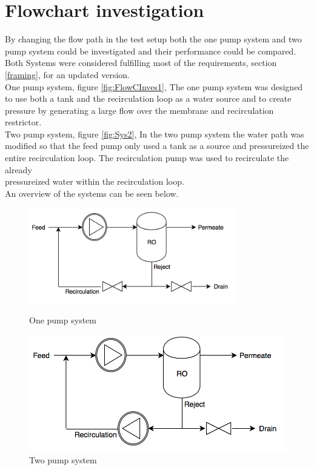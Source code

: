 

\section{Flowchart investigation}
By changing the flow path in the test setup both the one pump system and two pump system could be investigated and their performance could be compared. Both Systems were considered fulfilling most of the requirements, section \ref{framing}, for an updated version. \\

One pump system, figure \ref{fig:FlowCInves1}, The one pump system was designed to use both a tank and the recirculation loop as a water source and to create pressure by generating a large flow over the membrane and recirculation restrictor. \\


Two pump system, figure \ref{fig:Sys2}, In the two pump system the water path was modified so that the feed pump only used a tank as a source and pressureized the entire recirculation loop. The recirculation pump was used to recirculate the already\\ pressureized water within the recirculation loop.\\


An overview of the systems can be seen below.\\
\begin{figure}[h]
\centering
\begin{minipage}{.5\textwidth}
    \centering
    \includegraphics[width=0.8\textwidth]{Sys1}
    \caption{One pump system}
    \label{fig:System1}
\end{minipage}%
\begin{minipage}{.5\textwidth}
  \centering
  \includegraphics[width=.8\linewidth]{Sys2}
  \caption{Two pump system}
  \label{fig:System2}
\end{minipage}
\end{figure}

